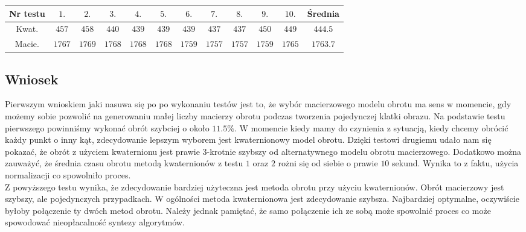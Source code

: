 \documentclass[a4paper,twoside,11pt,reqno]{mwrep}
\theoremstyle{plain} \newtheorem{twr}{Twierdzenie}
\theoremstyle{plain} \newtheorem{lem}{Lemat}
\theoremstyle{definition} \newtheorem{defi}{Definicja}
\theoremstyle{remark} \newtheorem*{wni}{Wniosek}
\theoremstyle{definition} \newtheorem{uwaga}{Uwaga}
\theoremstyle{definition}\newtheorem{prz}{Przykład}
\begin{document}
\begin{table}[h]
\begin{tabular}{|c|c|c|c|c|c|c|c|c|c|c|c|}
\hline
 Nr testu   & $1.$&$2.$ &  $3.$  &  $4.$ &  $5.$ &  $6.$ &  $7.$ &  $8.$ &  $9.$ &  $10.$ & Średnia \\ \hline
Kwat.      &$457$&$458$&$440$&$439$&$439$&$439$&$437$&$437$&$450$&$449$&  $444.5$   \\ \hline
Macie. &$1767$&$1769$&$1768$&$1768$&$1768$&$1759$&$1757$&$1757$&$1759$&$1765$& $1763.7$       \\ \hline
\end{tabular}
\end{table}

\subsection*{Wniosek}
Pierwszym wnioskiem jaki nasuwa się po po wykonaniu testów jest to, że wybór macierzowego 
modelu obrotu ma sens w momencie, gdy możemy sobie pozwolić na generowaniu małej liczby
macierzy obrotu podczas tworzenia pojedynczej klatki obrazu. Na podstawie testu pierwszego 
powinniśmy wykonać obrót szybciej o około $11.5\%$. 
W momencie kiedy mamy do czynienia z sytuacją, kiedy chcemy obrócić każdy punkt o inny kąt, 
zdecydowanie lepszym wyborem jest kwaternionowy model obrotu. Dzięki testowi drugiemu
udało nam się pokazać, że obrót z użyciem kwaternionu jest prawie $3$-krotnie szybszy od
alternatywnego modelu obrotu macierzowego. Dodatkowo można zauważyć, że średnia czasu obrotu metodą kwaternionów 
z testu $1$ oraz $2$ rożni się od siebie o prawie $10$ sekund. Wynika to z faktu, użycia normalizacji co spowolniło proces.\\

Z powyższego testu wynika, że zdecydowanie bardziej użyteczna jest metoda obrotu przy użyciu kwaternionów. 
Obrót macierzowy jest szybszy, ale pojedynczych przypadkach. W ogólności metoda kwaternionowa jest zdecydowanie szybsza.
Najbardziej optymalne, oczywiście byłoby połączenie ty dwóch metod obrotu. Należy jednak pamiętać, że samo połączenie 
ich ze sobą może spowolnić proces co może spowodować nieopłacalność syntezy algorytmów.   
\end{document}
